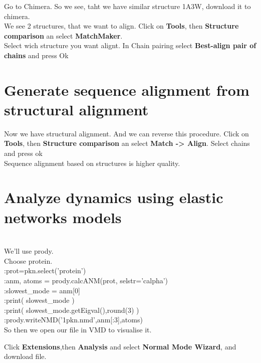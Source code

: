 \documentclass{article}
\begin{document}
Go to Chimera. So we see, taht we have similar structure 1A3W, download it to chimera. \\

We see 2 structures, that we want to align. Click on \textbf{Tools}, then \textbf{Structure comparison} an select \textbf{MatchMaker}. \\

Select wich structure you want alignt. In Chain pairing select \textbf{Best-align pair of chains} and press Ok \\





\section{Generate sequence alignment from structural alignment}

Now we have structural alignment. And we can reverse this procedure. Click on \textbf{Tools}, then \textbf{Structure comparison} an select \textbf{Match -> Align}. Select chains and press ok \\

Sequence alignment based on structures is higher quality. \\





\section{Analyze dynamics using elastic networks models}\\

We'll use prody. \\

Choose protein. \\

:prot=pkn.select('protein') \\

:anm, atoms = prody.calcANM(prot, selstr='calpha') \\

:slowest\_mode = anm[0] \\

:print( slowest\_mode ) \\

:print( slowest\_mode.getEigval(),round(3) ) \\

:prody.writeNMD('1pkn.nmd',anm[:3],atoms) \\

So then we open our file in VMD to visualise it.

Click \textbf{Extensions},then \textbf{Analysis} and select \textbf{Normal Mode Wizard}, and download file.
\end{document}
